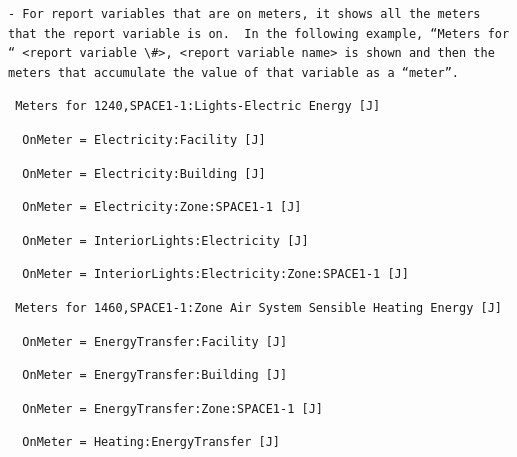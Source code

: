\begin{lstlisting}
- For report variables that are on meters, it shows all the meters that the report variable is on.  In the following example, “Meters for “ <report variable \#>, <report variable name> is shown and then the meters that accumulate the value of that variable as a “meter”.
\end{lstlisting}

\begin{lstlisting}
 Meters for 1240,SPACE1-1:Lights-Electric Energy [J]
\end{lstlisting}

\begin{lstlisting}
  OnMeter = Electricity:Facility [J]
\end{lstlisting}

\begin{lstlisting}
  OnMeter = Electricity:Building [J]
\end{lstlisting}

\begin{lstlisting}
  OnMeter = Electricity:Zone:SPACE1-1 [J]
\end{lstlisting}

\begin{lstlisting}
  OnMeter = InteriorLights:Electricity [J]
\end{lstlisting}

\begin{lstlisting}
  OnMeter = InteriorLights:Electricity:Zone:SPACE1-1 [J]
\end{lstlisting}

\begin{lstlisting}
 Meters for 1460,SPACE1-1:Zone Air System Sensible Heating Energy [J]
\end{lstlisting}

\begin{lstlisting}
  OnMeter = EnergyTransfer:Facility [J]
\end{lstlisting}

\begin{lstlisting}
  OnMeter = EnergyTransfer:Building [J]
\end{lstlisting}

\begin{lstlisting}
  OnMeter = EnergyTransfer:Zone:SPACE1-1 [J]
\end{lstlisting}

\begin{lstlisting}
  OnMeter = Heating:EnergyTransfer [J]
\end{lstlisting}

